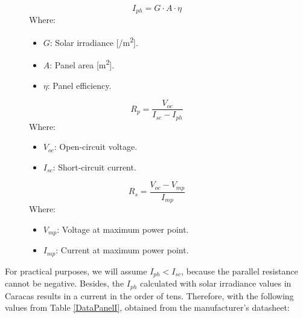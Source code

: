 \begin{figure}[H]
    \centering
    \begin{minipage}[c]{0.30\textwidth}
        \begin{equation*}
            I_{ph} = G\cdot A \cdot \eta
        \end{equation*}
        Where:
        \begin{itemize}
          \item $G$: Solar irradiance [\watt/\si{\meter\squared}].
          \item $A$: Panel area [\si{\meter\squared}].
          \item $\eta$: Panel efficiency.
        \end{itemize}
    \end{minipage}
    \begin{minipage}[c]{0.30\textwidth}
        \begin{equation}\label{ParalelResistor}
            R_{p} = \frac{V_{oc}}{I_{sc}-I_{ph}}
        \end{equation}
        Where:
        \begin{itemize}
          \item $V_{oc}$: Open-circuit voltage.
          \item $I_{sc}$: Short-circuit current.
        \end{itemize}
    \end{minipage}
    \begin{minipage}[c]{0.30\textwidth}
        \begin{equation}\label{SerieResistor}
            R_{s} = \frac{V_{oc}-V_{mp}}{I_{mp}}
        \end{equation}
        Where:
        \begin{itemize}
          \item $V_{mp}$: Voltage at maximum power point.
          \item $I_{mp}$: Current at maximum power point.
        \end{itemize}
    \end{minipage}
\end{figure}

For practical purposes, we will assume $I_{ph} < I_{sc}$, because the parallel resistance cannot be negative. Besides, the $I_{ph}$ calculated with solar irradiance values in Caracas results in a current in the order of tens. Therefore, with the following values from Table \ref{DataPanelI}, obtained from the manufacturer's datasheet:

